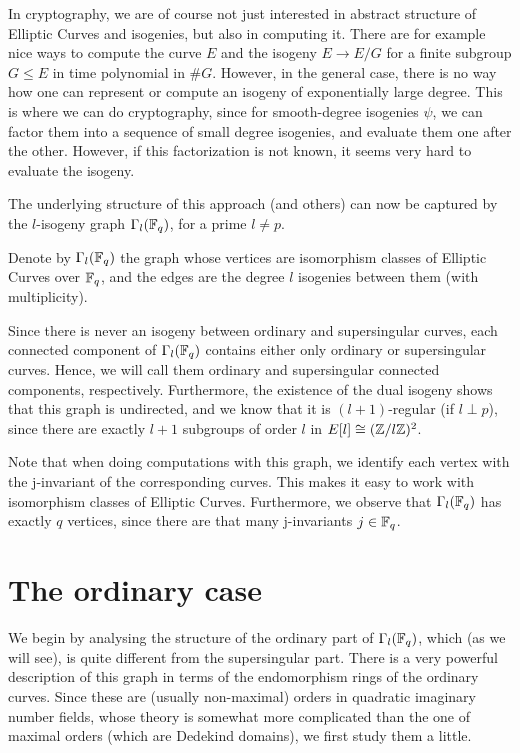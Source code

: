 
In cryptography, we are of course not just interested in abstract structure of Elliptic Curves and isogenies, but also in computing it.
There are for example nice ways to compute the curve $E$ and the isogeny $E \to E/G$ for a finite subgroup $G \leq E$ in time polynomial in $\#G$.
However, in the general case, there is no way how one can represent or compute an isogeny of exponentially large degree.
This is where we can do cryptography, since for smooth-degree isogenies $\psi$, we can factor them into a sequence of small degree isogenies, and evaluate them one after the other.
However, if this factorization is not known, it seems very hard to evaluate the isogeny.

The underlying structure of this approach (and others) can now be captured by the $l$-isogeny graph $\Gamma_l(\mathbb{F}_q)$, for a prime $l \neq p$.
\begin{definition}
    Denote by $\Gamma_l(\mathbb{F}_q)$ the graph whose vertices are isomorphism classes of Elliptic Curves over $\mathbb{F}_q$, and the edges are the degree $l$ isogenies between them (with multiplicity).
\end{definition}
Since there is never an isogeny between ordinary and supersingular curves, each connected component of $\Gamma_l(\mathbb{F}_q)$ contains either only ordinary or supersingular curves.
Hence, we will call them ordinary and supersingular connected components, respectively.
Furthermore, the existence of the dual isogeny shows that this graph is undirected, and we know that it is $(l + 1)$-regular (if $l \perp p$), since there are exactly $l + 1$ subgroups of order $l$ in $E[l] \cong (\mathbb{Z}/l\mathbb{Z})^2$.

Note that when doing computations with this graph, we identify each vertex with the j-invariant of the corresponding curves.
This makes it easy to work with isomorphism classes of Elliptic Curves.
Furthermore, we observe that $\Gamma_l(\mathbb{F}_q)$ has exactly $q$ vertices, since there are that many j-invariants $j \in \mathbb{F}_q$.

\section{The ordinary case}
We begin by analysing the structure of the ordinary part of $\Gamma_l(\mathbb{F}_q)$, which (as we will see), is quite different from the supersingular part.
There is a very powerful description of this graph in terms of the endomorphism rings of the ordinary curves.
Since these are (usually non-maximal) orders in quadratic imaginary number fields, whose theory is somewhat more complicated than the one of maximal orders (which are Dedekind domains), we first study them a little.

